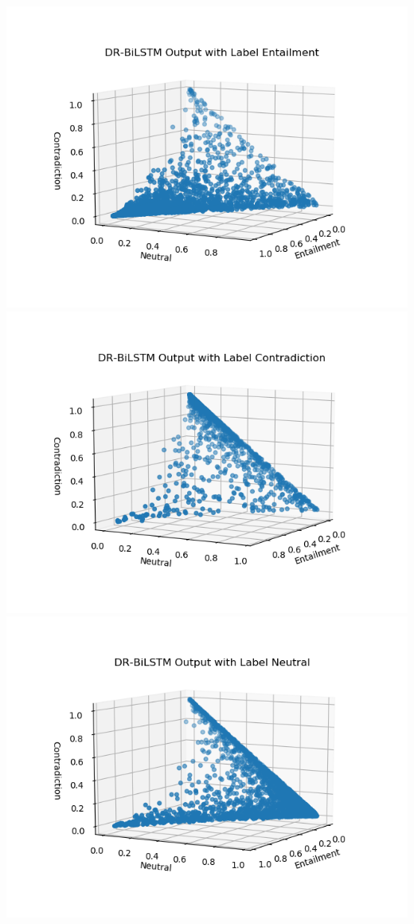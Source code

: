 \documentclass[12pt,letterpaper]{article}
\begin{document}
\begin{center}
\includegraphics[scale=0.35]{lstmEntailment.png}
\includegraphics[scale=0.35]{lstmContradiction.png}
\includegraphics[scale=0.35]{lstmNeutral.png}
\end{center}\\
\end{document}
